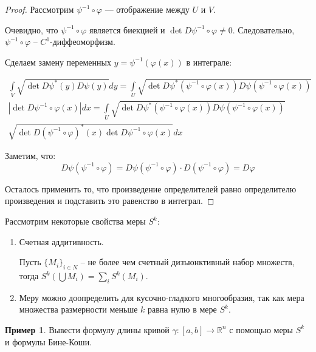 \documentclass[a5paper]{article}
\newcounter{through}
\theoremstyle{plain}
\theoremstyle{definition}
\newtheorem{example}[through]{Пример}
\numberwithin{through}{section}
\numberwithin{equation}{section}
\begin{document}
\begin{proof}
	Рассмотрим $\psi^{-1} \circ \varphi$ --- отображение между $U$ и $V$.
	
	Очевидно, что $\psi^{-1} \circ \varphi$ является биекцией и $\det D \psi^{-1} \circ \varphi \not= 0$. Следовательно, $\psi^{-1} \circ \varphi$ -- $C^1$-диффеоморфизм.
	
	Сделаем замену переменных $y = \psi^{-1} (\varphi (x))$ в интеграле:
	
	\begin{multline*}
		\int\limits_{V} \sqrt{\det D \psi^* (y) D \psi (y)} dy = 
		\int\limits_{U} \sqrt{\det D \psi^* (\psi^{-1} \circ \varphi (x)) D \psi (\psi^{-1} \circ \varphi (x)) } \\ 
		|\det D \psi^{-1} \circ \varphi (x)|dx = \int\limits_{U} \sqrt{\det D \psi^* (\psi^{-1} \circ \varphi (x)) D \psi (\psi^{-1} \circ \varphi (x)) } \\ \sqrt{\det D (\psi^{-1} \circ \varphi)^* (x) \det D \psi^{-1} \circ \varphi (x)} dx
	\end{multline*}
	
	Заметим, что: 
	\begin{equation*}
		D \psi(\psi^{-1} \circ \varphi) = D \psi (\psi^{-1} \circ \varphi) \cdot D (\psi^{-1} \circ \varphi) = D \varphi
	\end{equation*}
	
	
	Осталось применить то, что произведение определителей равно определителю произведения и подставить это равенство в интеграл.
\end{proof}

Рассмотрим некоторые свойства меры $S^k$:

\begin{enumerate}
	\item Счетная аддитивность. 
	
	Пусть $\{M_i\}_{i \in N}$ -- не более чем счетный дизъюнктивный набор множеств, тогда $S^k(\bigcup M_i) = \sum\limits_{i} S^k(M_i)$.
	
	\item Меру можно доопределить для кусочно-гладкого многообразия, так как мера множества размерности меньше $k$ равна нулю в мере $S^k$.
\end{enumerate}

\begin{example}
	Вывести формулу длины кривой $\gamma : [a, b] \to \mathbb{R}^n$ с помощью меры $S^k$ и формулы Бине-Коши. 
\end{example}
\end{document}
